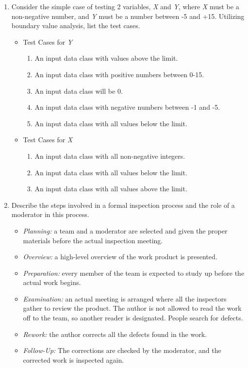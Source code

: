 \documentclass[11pt]{article}
\begin{document}
\begin{enumerate}
        \item Consider the simple case of testing 2 variables, \textit{X} and \textit{Y}, where \textit{X} must be a non-negative number, and \textit{Y} must be a number between -5 and +15. Utilizing boundary value analysis, list the test cases. 
        \begin{itemize}
            \item Test Cases for \textit{Y}
            \begin{enumerate}
                \item An input data class with values above the limit.
                \item An input data class with positive numbers between 0-15.
                \item An input data class will be 0.
                \item An input data class with negative numbers between -1 and -5.
                \item An input data class with all values below the limit.
            \end{enumerate}
            \item Test Cases for \textit{X}
            \begin{enumerate}
                \item An input data class with all non-negative integers. 
                \item An input data class with all values below the limit.
                \item An input data class with all values above the limit.
            \end{enumerate}
        \end{itemize}
        
        
        \item Describe the steps involved in a formal inspection process and the role of a moderator in this process.
        \begin{itemize}
        \item \textit{Planning: } a team and a moderator are selected and given the proper materials before the actual inspection meeting.
        \item \textit{Overview: } a high-level overview of the work product is presented.
        \item \textit{Preparation: } every member of the team is expected to study up before the actual work begins.
        \item \textit{Examination: } an actual meeting is arranged where all the inspectors gather to review the product. The author is not allowed to read the work off to the team, so another reader is designated. People search for defects. 
        \item \textit{Rework: } the author corrects all the defects found in the work. 
        \item \textit{Follow-Up: } The corrections are checked by the moderator, and the corrected work is inspected again.
        \end{itemize}
        

\end{enumerate}
\end{document}
